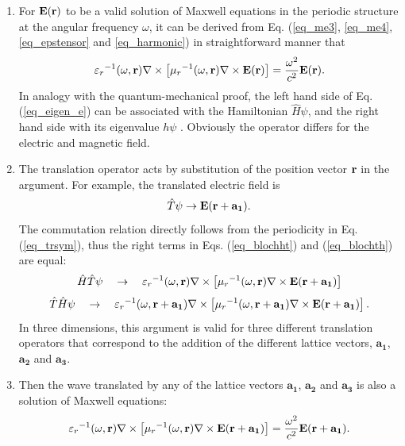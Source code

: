 \begin{enumerate}
\item{
For $\mathbf{E}({\mathbf{r}})$ to be a  valid solution of Maxwell equations in the periodic structure at the angular frequency $\omega$,
it can be derived from Eq. (\ref{eq_me3}, \ref{eq_me4}, \ref{eq_epstensor} and \ref{eq_harmonic}) in straightforward manner that
\begin{equation} 
{\varepsilon_r}^{-1}(\omega,{\mathbf{r}}) \nabla\times \left[{\mu_r}^{-1 }(\omega,{\mathbf{r}}) \nabla\times \mathbf{E}({\mathbf{r}}) \right] = \frac{\omega^2}{c^2}\mathbf{E}({\mathbf{r}}).   \label{eq_eigen_e}
\end{equation}
In analogy with the quantum-mechanical proof, the left hand side of Eq. (\ref{eq_eigen_e}) can be associated with the Hamiltonian $\hat H\psi$, and the right hand side with its eigenvalue $h\psi$ \cite{johnson2003introduction}. Obviously the operator differs for the electric and magnetic field.
} 
\item{
The translation operator acts by substitution of the position vector ${\mathbf{r}}$ in the argument. For example, the translated electric field is
\begin{equation} \hat T\psi \rightarrow \mathbf{E}({\mathbf{r}}+\mathbf{a_1}). \label{eq_blocht}\end{equation}
The commutation relation directly follows from the periodicity in Eq. (\ref{eq_trsym}), thus the right terms in Eqs. (\ref{eq_blochht}) and (\ref{eq_blochth}) are equal:
\begin{equation} \hat H \hat T \psi \quad  \rightarrow \quad  {\varepsilon_r}^{-1}(\omega,{\mathbf{r}}             ) \nabla\times \left[{\mu_r}^{-1 }(\omega,{\mathbf{r}}             ) \nabla\times \mathbf{E}({\mathbf{r}}+\mathbf{a_1})\right]  \label{eq_blochht}\end{equation}
\begin{equation} \hat T \hat H \psi \quad  \rightarrow \quad  {\varepsilon_r}^{-1}(\omega,{\mathbf{r}}+\mathbf{a_1}) \nabla\times \left[{\mu_r}^{-1 }(\omega,{\mathbf{r}}+\mathbf{a_1}) \nabla\times \mathbf{E}({\mathbf{r}}+\mathbf{a_1})\right] .  \label{eq_blochth}\end{equation}
In three dimensions, this argument is valid for three different translation operators that correspond to the addition of the different lattice vectors, $\mathbf{a_1}$, $\mathbf{a_2}$ and $\mathbf{a_3}$.
} 
\item{
Then the wave translated by any of the lattice vectors $\mathbf{a_1}$, $\mathbf{a_2}$ and $\mathbf{a_3}$ is also a solution of Maxwell equations:
\begin{equation}  {\varepsilon_r}^{-1}(\omega,{\mathbf{r}}) \nabla\times \left[{\mu_r}^{-1 }(\omega,{\mathbf{r}}) \nabla\times   \mathbf{E}({\mathbf{r}}+\mathbf{a_1})\right] =  \frac{\omega^2}{c^2}\mathbf{E}({\mathbf{r}}+\mathbf{a_1}).  \label{eq_blochme}\end{equation}
}
\end{enumerate}
